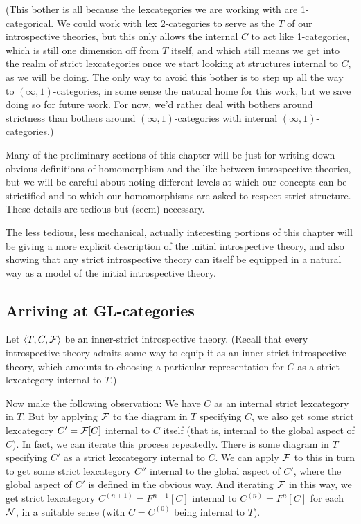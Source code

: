 (This bother is all because the lexcategories we are working with are 1-categorical. We could work with lex 2-categories to serve as the $T$ of our introspective theories, but this only allows the internal $C$ to act like 1-categories, which is still one dimension off from $T$ itself, and which still means we get into the realm of strict lexcategories once we start looking at structures internal to $C$, as we will be doing. The only way to avoid this bother is to step up all the way to $(\infty, 1)$-categories, in some sense the natural home for this work, but we save doing so for future work. For now, we'd rather deal with bothers around strictness than bothers around $(\infty, 1)$-categories with internal $(\infty, 1)$-categories.)

Many of the preliminary sections of this chapter will be just for writing down obvious definitions of homomorphism and the like between introspective theories, but we will be careful about noting different levels at which our concepts can be strictified and to which our homomorphisms are asked to respect strict structure. These details are tedious but (seem) necessary.

The less tedious, less mechanical, actually interesting portions of this chapter will be giving a more explicit description of the initial introspective theory, and also showing that any strict introspective theory can itself be equipped in a natural way as a model of the initial introspective theory.


\subsection{Arriving at GL-categories}
Let $\langle T, C, \mathcal{F}\rangle$ be an inner-strict introspective theory. (Recall that every introspective theory admits some way to equip it as an inner-strict introspective theory, which amounts to choosing a particular representation for $C$ as a strict lexcategory internal to $T$.)

Now make the following observation: We have $C$ as an internal strict lexcategory in $T$. But by applying $\mathcal{F}$ to the diagram in $T$ specifying $C$, we also get some strict lexcategory $C' = \mathcal{F}[C]$ internal to $C$ itself (that is, internal to the global aspect of $C$). In fact, we can iterate this process repeatedly. There is some diagram in $T$ specifying $C'$ as a strict lexcategory internal to $C$. We can apply $\mathcal{F}$ to this in turn to get some strict lexcategory $C''$ internal to the global aspect of $C'$, where the global aspect of $C'$ is defined in the \TODO obvious way. And iterating $\mathcal{F}$ in this way, we get strict lexcategory $C^{(n + 1)} = F^{n + 1}[C]$ internal to $C^{(n)} = F^n[C]$ for each $\mathcal{N}$, in a suitable sense (with $C = C^{(0)}$ being internal to $T$). \TODO

